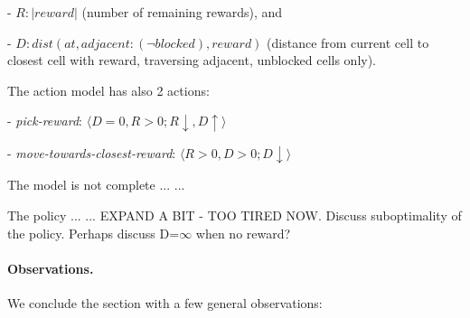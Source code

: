 \documentclass[letterpaper]{article} %
\newcommand{\tuple}[1]{\ensuremath{\langle #1 \rangle}}
\newcommand{\abs}[1]{\ensuremath{\left\vert{#1}\right\vert}}
\begin{document}
- $R: \abs{reward}$ (number of remaining rewards), and

- $D: dist(at, adjacent:(\neg blocked), reward)$ (distance from current cell to closest cell with reward, traversing adjacent, unblocked cells only).

\noindent The action model has also 2 actions:

- \emph{pick-reward}: \tuple{D=0, R > 0;  R \downarrow, D \uparrow}

- \emph{move-towards-closest-reward}: \tuple{R>0, D>0; D \downarrow}

The model is not complete ... 
...

The policy ... 
... EXPAND A BIT - TOO TIRED NOW.
Discuss suboptimality of the policy.
Perhaps discuss D=$\infty$ when no reward?

% 



\paragraph{Observations.}
We conclude the section with a few general observations:
\end{document}

